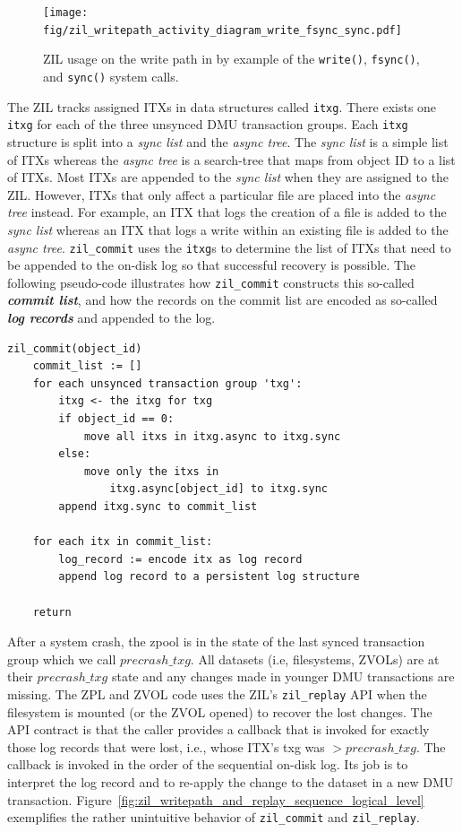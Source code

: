 \documentclass[12pt,a4paper,twoside]{book}
\begin{document}
\begin{figure}[H]
    \centering
    \texttt{[image: fig/zil\_writepath\_activity\_diagram\_write\_fsync\_sync.pdf]}
    \caption{
        ZIL usage on the write path in by example of the \lstinline{write()}, \lstinline{fsync()}, and \lstinline{sync()} system calls.
    }
    \label{fig:zil_api_syscall_activity_diagrams}
\end{figure}

The ZIL tracks assigned ITXs in data structures called \lstinline{itxg}.
There exists one \lstinline{itxg} for each of the three unsynced DMU transaction groups.
Each \lstinline{itxg} structure is split into a \textit{sync list} and the \textit{async tree}.
The \textit{sync list} is a simple list of ITXs whereas the \textit{async tree} is a search-tree that maps from object ID to a list of ITXs.
Most ITXs are appended to the \textit{sync list} when they are assigned to the ZIL.
However, ITXs that only affect a particular file are placed into the \textit{async tree} instead.
For example, an ITX that logs the creation of a file is added to the \textit{sync list} whereas an ITX that logs a write within an existing file is added to the \textit{async tree}.
\lstinline{zil_commit} uses the \lstinline{itxg}s to determine the list of ITXs that need to be appended to the on-disk log so that successful recovery is possible.
The following pseudo-code illustrates how \lstinline{zil_commit} constructs this so-called \textit{\textbf{commit list}}, and how the records on the commit list are encoded as so-called \textit{\textbf{log records}} and appended to the log.

\begin{lstlisting}[style=figurepseudocode]
zil_commit(object_id)
    commit_list := []
    for each unsynced transaction group 'txg':
        itxg <- the itxg for txg
        if object_id == 0:
            move all itxs in itxg.async to itxg.sync
        else:
            move only the itxs in
                itxg.async[object_id] to itxg.sync
        append itxg.sync to commit_list

    for each itx in commit_list:
        log_record := encode itx as log record
        append log record to a persistent log structure

    return
\end{lstlisting}

After a system crash, the zpool is in the state of the last synced transaction group which we call $precrash\_txg$.
All datasets (i.e, filesystems, ZVOLs) are at their $precrash\_txg$ state and any changes made in younger DMU transactions are missing.
The ZPL and ZVOL code uses the ZIL's \lstinline{zil_replay} API when the filesystem is mounted (or the ZVOL opened) to recover the lost changes.
The API contract is that the caller provides a callback that is invoked for exactly those log records that were lost, i.e., whose ITX's txg was $> precrash\_txg$.
The callback is invoked in the order of the sequential on-disk log.
Its job is to interpret the log record and to re-apply the change to the dataset in a new DMU transaction.
Figure~\ref{fig:zil_writepath_and_replay_sequence_logical_level} exemplifies the rather unintuitive behavior of \lstinline{zil_commit} and \lstinline{zil_replay}.
\end{document}
